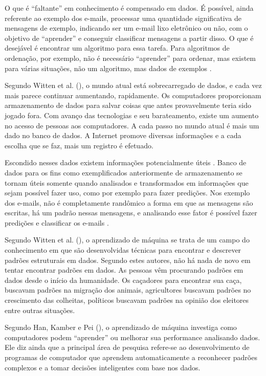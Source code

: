O que é “faltante'' em conhecimento é compensado em dados. É possível, ainda referente ao exemplo dos e-mails, processar uma quantidade significativa de mensagens de exemplo, indicando ser um e-mail lixo eletrônico ou não, com o objetivo de “aprender” e conseguir classificar mensagens a partir disso. O que é desejável é encontrar um algoritmo para essa tarefa. Para algoritmos de ordenação, por exemplo, não é necessário “aprender” para ordenar, mas existem para várias situações, não um algoritmo, mas dados de exemplos \cite{Alpaydin:2010:IML:1734076}.


Segundo Witten et al. (\citeyear{Witten:2016:DMF:3086818}), o mundo atual está sobrecarregado de dados, e cada vez mais parece continuar aumentando, rapidamente. Os computadores proporcionam armazenamento de dados para salvar coisas que antes provavelmente teria sido jogado fora. Com avanço das tecnologias e seu barateamento, existe um aumento no acesso de pessoas aos computadores. A cada passo no mundo atual é mais um dado no banco de dados. A Internet promove diversas informações e a cada escolha que se faz, mais um registro é efetuado.	

Escondido nesses dados existem informações potencialmente úteis \cite{Witten:2016:DMF:3086818}. Banco de dados para os fins como exemplificados anteriormente de armazenamento se tornam úteis somente quando analisados e transformados em informações que sejam possível fazer uso, como por exemplo para fazer predições. Nos exemplo dos e-mails, não é completamente randômico a forma em que as mensagens são escritas, há um padrão nessas mensagens, e analisando esse fator é possível fazer predições e classificar os e-mails \cite{Alpaydin:2010:IML:1734076}.

Segundo Witten et al. (\citeyear{Witten:2016:DMF:3086818}), o aprendizado de máquina se trata de um campo do conhecimento em que são desenvolvidas técnicas para encontrar e descrever padrões estruturais em dados. Segundo estes autores, não há nada de novo em tentar encontrar padrões em dados. As pessoas vêm procurando padrões em dados desde o início da humanidade. Os caçadores para encontrar sua caça, buscavam padrões na migração dos animais, agricultores buscavam padrões no crescimento das colheitas, políticos buscavam padrões na opinião dos eleitores entre outras situações.

Segundo Han, Kamber e Pei (\citeyear{Han:2011:DMC:1972541}), o aprendizado de máquina investiga como computadores podem “aprender'' ou melhorar sua performance analisando dados. Ele diz ainda que a principal área de pesquisa refere-se ao desenvolvimento de programas de computador que aprendem automaticamente a reconhecer padrões complexos e a tomar decisões inteligentes com base nos dados.

